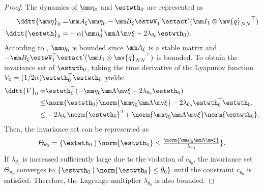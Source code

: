 \documentclass[letterpaper, 10 pt, conference]{ieeeconf}  %
\newcommand*{\q}{\mv{q}}
\begin{document}
\begin{proof}
The dynamics of ${\mm \eta}_0$ and ${\estwth}_0$ are represented as
\begin{equation}
    \begin{aligned}     
        \ddtt{\mm \eta}_0 =& 
        \mm A_\xi{\mm \eta}_0 -\mm B_\xi 
        \estwV_1^\top \estact'(\mm I_1\otimes {\q_{NN}}^\top )
        \\
        \ddtt{{\estwth}}_0
        =&
        -\alpha 
        (
            {\mm \eta}_0^\top \mm \Lambda\mv \xi+2\lambda_{\theta_0} {\estwth}_0
        )
        .
    \end{aligned}
\end{equation}
According to \cite[Chap.~4 T.~1.9]{Desoer:2009aa}, ${\mm \eta}_0$ is bounded since $\mm A_\xi$ is a stable matrix and $-\mm B_\xi\estwV_1^\top \estact'(\mm I_1\otimes {\q_{NN}}^\top )$ is bounded.
To obtain the invariance set of ${\estwth}_0$, taking the time derivative of the Lyapunov function $V_0=(1/2\alpha){\estwth}_0^\top {\estwth}_0$ yields:
\begin{equation}
    \begin{aligned}
        \ddtt {V}_0 =& 
        {\estwth}_0^\top (-{\mm \eta}_0\mm \Lambda\mv \xi -2\lambda_{\theta_0}{\estwth}_0)
        \\
        \le &
        \norm{{\estwth}_0} \norm{{\mm \eta}_0\mm \Lambda\mv \xi} 
        -
        2\lambda_{\theta_0} {\estwth}_0^\top {\estwth}_0
        ,
        \\
        \le &
        -2\lambda_{\theta_0} 
        \norm{{\estwth}_0}^2 
        + 
        \norm{{\mm \eta}_0\mm \Lambda\mv \xi}
        \norm{{\estwth}_0}
        .
    \end{aligned}
\end{equation}
Then, the invariance set can be represented as 
\begin{equation}
    \Theta_{{\theta}_0} =
    \{
        {\estwth}_0\mid\norm{\estwth_0}
        \le
        \tfrac{
            \norm{{\mm \eta}_0\mm \Lambda\mv \xi}
        }{
            \lambda_{\theta_0}
        }
    \}
    .    
\end{equation}
If $\lambda_{\theta_0}$ is increased sufficiently large due to the violation of $c_{\theta_0}$, the invariance set $\Theta_{{\theta}_0}$ converges to $\{{\estwth}_0 \mid \norm{{\estwth}_0} \le \bar\theta_0\}$ until the constraint $c_{\theta_0}$ is satisfied.
Therefore, the Lagrange multiplier $\lambda_{\theta_0}$ is also bounded.

\end{proof}
\end{document}
